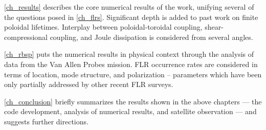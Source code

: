 \cref{ch_results} describes the core numerical results of the work, unifying several of the questions posed in \cref{ch_flrs}. Significant depth is added to past work on finite poloidal lifetimes\cite{mann_1995,radoski_1974}. Interplay between poloidal-toroidal coupling, shear-compressional coupling, and Joule dissipation is considered from several angles. 

\cref{ch_rbsp} puts the numerical results in physical context through the analysis of data from the Van Allen Probes mission. FLR occurrence rates are considered in terms of location, mode structure, and polarization -- parameters which have been only partially addressed by other recent FLR surveys\cite{dai_2015,motoba_2015}. 

\cref{ch_conclusion} briefly summarizes the results shown in the above chapters --- the code development, analysis of numerical results, and satellite observation --- and suggests further directions. 






